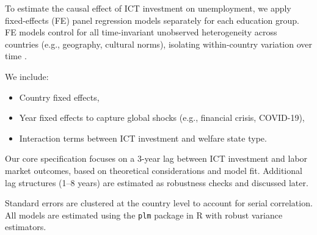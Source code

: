 To estimate the causal effect of ICT investment on unemployment, we apply fixed-effects (FE) panel 
regression models separately for each education group. FE models control for all time-invariant 
unobserved heterogeneity across countries (e.g., geography, cultural norms), isolating within-country 
variation over time \parencite{wooldridge2010econometric}.

We include:
\begin{itemize}
  \item Country fixed effects,
  \item Year fixed effects to capture global shocks (e.g., financial crisis, COVID-19),
  \item Interaction terms between ICT investment and welfare state type.
\end{itemize}

Our core specification focuses on a 3-year lag between ICT investment and labor market outcomes, 
based on theoretical considerations and model fit. Additional lag structures (1–8 years) are 
estimated as robustness checks and discussed later.

Standard errors are clustered at the country level to account for serial correlation. All models are 
estimated using the \texttt{plm} package in R with robust variance estimators.